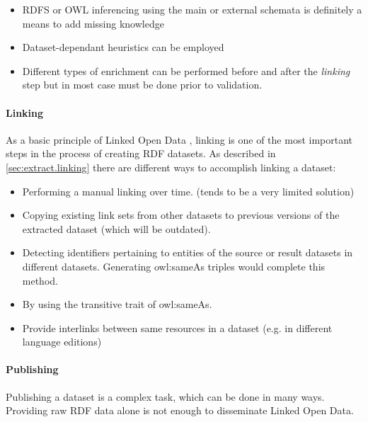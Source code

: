 \documentclass[a4paper,english,twoside,BCOR1.5cm,headsepline,DIV12,appendixprefix,final,12pt]{scrbook}
\def\emph{\textit}
\begin{document}
\begin{itemize}
\itemsep0em 
\item RDFS or OWL inferencing using the main or external schemata is definitely a means to add missing knowledge
\item Dataset-dependant heuristics can be employed
\item Different types of enrichment can be performed before and after the \emph{linking} step but in most case must be done prior to validation.
\end{itemize}


\vspace{-1.5em}
\paragraph{Linking}
As a basic principle of Linked Open Data%
, linking is one of the most important steps in the process of creating RDF datasets.
As described in \cref{sec:extract.linking} there are different ways to accomplish linking a dataset:

\begin{itemize}
\itemsep0em 
\item{Performing a manual linking over time. (tends to be a very limited solution)}
\item{Copying existing link sets from other datasets to previous versions of the extracted dataset (which will be outdated).}
\item{Detecting identifiers pertaining to entities of the source or result datasets in different datasets. Generating owl:sameAs triples would complete this method.}
\item By using the transitive trait of owl:sameAs.%
\item{Provide interlinks between same resources in a dataset (e.g. in different language editions)}
\end{itemize}

\vspace{-1.5em}
\paragraph{Publishing}
Publishing a dataset is a complex task, which can be done in many ways. 
Providing raw RDF data alone is not enough to disseminate Linked Open Data.
\end{document}
